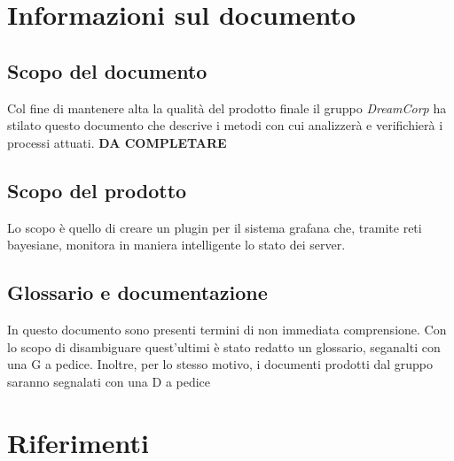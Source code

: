 \section{Informazioni sul documento}
\subsection{Scopo del documento}
 Col fine di mantenere alta la qualità del prodotto finale il gruppo \textit{DreamCorp} ha stilato questo documento che descrive i metodi con cui analizzerà e verifichierà i processi attuati. 
 \textbf{DA COMPLETARE}
 \subsection{Scopo del prodotto}
 Lo scopo è quello di creare un plugin per il sistema grafana che, tramite reti bayesiane, monitora in maniera intelligente lo stato dei server.
 \subsection{Glossario e documentazione}
 In questo documento sono presenti termini di non immediata comprensione. Con lo scopo di disambiguare quest'ultimi è stato redatto un glossario, seganalti con una G a pedice.
 Inoltre, per lo stesso motivo, i documenti prodotti dal gruppo saranno segnalati con una D a pedice
 \section{Riferimenti}